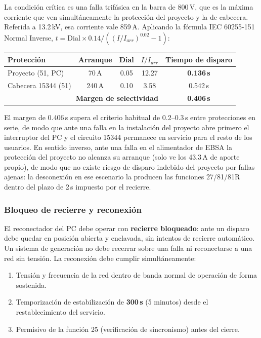 \documentclass[11pt,a4paper]{article}
\begin{document}
La condici\'on cr\'itica es una falla trif\'asica en la barra de 800\,V, que es la m\'axima corriente que ven simult\'aneamente la protecci\'on del proyecto y la de cabecera. Referida a 13.2\,kV, esa corriente vale 859\,A. Aplicando la f\'ormula IEC 60255-151 Normal Inverse, $t = \text{Dial}\times 0.14 / ((I/I_{arr})^{0.02}-1)$:

\begin{center}
\begin{tabular}{|l|c|c|c|c|}
\hline
\textbf{Protecci\'on} & \textbf{Arranque} & \textbf{Dial} & \textbf{$I/I_{arr}$} & \textbf{Tiempo de disparo} \\ \hline
Proyecto (51, PC) & 70\,A & 0.05 & 12.27 & \textbf{0.136\,s} \\ \hline
Cabecera 15344 (51) & 240\,A & 0.10 & 3.58 & 0.542\,s \\ \hline
\multicolumn{4}{|r|}{\textbf{Margen de selectividad}} & \textbf{0.406\,s} \\ \hline
\end{tabular}
\end{center}

El margen de 0.406\,s supera el criterio habitual de 0.2--0.3\,s entre protecciones en serie, de modo que ante una falla en la instalaci\'on del proyecto abre primero el interruptor del PC y el circuito 15344 permanece en servicio para el resto de los usuarios. En sentido inverso, ante una falla en el alimentador de EBSA la protecci\'on del proyecto no alcanza su arranque (solo ve los 43.3\,A de aporte propio), de modo que no existe riesgo de disparo indebido del proyecto por fallas ajenas: la desconexi\'on en ese escenario la producen las funciones 27/81/81R dentro del plazo de 2\,s impuesto por el recierre.

\subsubsection{Bloqueo de recierre y reconexi\'on}

El reconectador del PC debe operar con \textbf{recierre bloqueado}: ante un disparo debe quedar en posici\'on abierta y enclavada, sin intentos de recierre autom\'atico. Un sistema de generaci\'on no debe recerrar sobre una falla ni reconectarse a una red sin tensi\'on. La reconexi\'on debe cumplir simult\'aneamente:

\begin{enumerate}
\item Tensi\'on y frecuencia de la red dentro de banda normal de operaci\'on de forma sostenida.
\item Temporizaci\'on de estabilizaci\'on de \textbf{300\,s} (5 minutos) desde el restablecimiento del servicio.
\item Permisivo de la funci\'on 25 (verificaci\'on de sincronismo) antes del cierre.
\end{enumerate}
\end{document}

